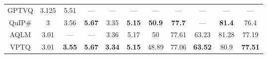 \begin{table}[hbt!]
{\begin{tabular}{c|c|cccc|ccccc}
GPTVQ                & 3.125                & 5.51                    & ---                     & ---                     & ---                     & ---                 & ---                 & ---                 & ---                 & ---                 \\
QuIP\#               & 3                    & 3.56                    & \textbf{5.67}           & 3.35                    & \textbf{5.15}           & \textbf{50.9}       & \textbf{77.7}       & ---                 & \textbf{81.4}       & 76.4                \\
AQLM                 & 3.01                 & ---                     & ---                     & 3.36                    & 5.17                    & 50                  & 77.61               & 63.23               & 81.28               & 77.19               \\
VPTQ                 & 3.01                 & \textbf{3.55}           & \textbf{5.67}           & \textbf{3.34}           & \textbf{5.15}           & 48.89               & 77.06               & \textbf{63.52}      & 80.9                & \textbf{77.51}      \\ \hline
\end{tabular}
}
\end{table}